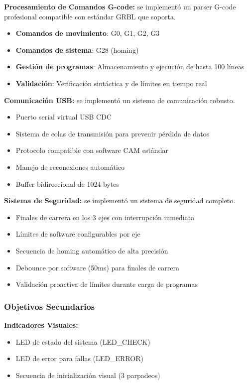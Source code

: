\documentclass[12pt]{article}
\begin{document}
\textbf{Procesamiento de Comandos G-code:} se implementó un parser G-code profesional compatible con estándar GRBL que soporta.
\begin{itemize}
    \item \textbf{Comandos de movimiento}: G0, G1, G2, G3
    \item \textbf{Comandos de sistema}: G28 (homing)
    \item \textbf{Gestión de programas}: Almacenamiento y ejecución de hasta 100 líneas
    \item \textbf{Validación}: Verificación sintáctica y de límites en tiempo real
\end{itemize}

\textbf{Comunicación USB:} se implementó un sistema de comunicación robusto.
\begin{itemize}
    \item Puerto serial virtual USB CDC
    \item Sistema de colas de transmisión para prevenir pérdida de datos
    \item Protocolo compatible con software CAM estándar
    \item Manejo de reconexiones automático
    \item Buffer bidireccional de 1024 bytes
\end{itemize}

\textbf{Sistema de Seguridad:} se implementó un sistema de seguridad completo.
\begin{itemize}
    \item Finales de carrera en los 3 ejes con interrupción inmediata
    \item Límites de software configurables por eje
    \item Secuencia de homing automático de alta precisión
    \item Debounce por software (50ms) para finales de carrera
    \item Validación proactiva de límites durante carga de programas
\end{itemize}

\subsubsection{Objetivos Secundarios}

\textbf{Indicadores Visuales:}
\begin{itemize}
    \item LED de estado del sistema (LED\_CHECK)
    \item LED de error para fallas (LED\_ERROR)
    \item Secuencia de inicialización visual (3 parpadeos)
\end{itemize}
\end{document}
